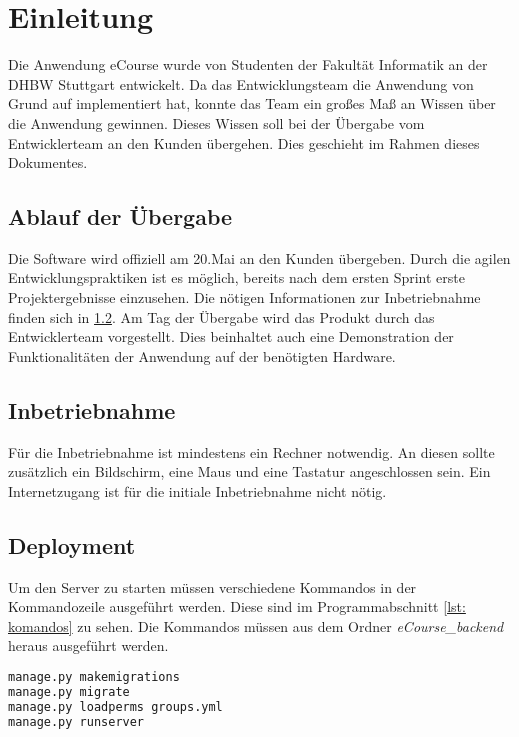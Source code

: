 
\chapter{Einleitung}

Die Anwendung eCourse wurde von Studenten der Fakultät Informatik an der DHBW Stuttgart entwickelt. Da das Entwicklungsteam die Anwendung von Grund auf implementiert hat, konnte das Team ein großes Maß an Wissen über die Anwendung gewinnen. Dieses Wissen soll bei der Übergabe vom Entwicklerteam an den Kunden übergehen. Dies geschieht im Rahmen dieses Dokumentes. 

\section{Ablauf der Übergabe}
Die Software wird offiziell am 20.Mai an den Kunden übergeben. Durch die agilen Entwicklungspraktiken ist es möglich, bereits nach dem ersten Sprint erste Projektergebnisse einzusehen. Die nötigen Informationen zur Inbetriebnahme finden sich in \ref{sec:inbetrieb}.
Am Tag der Übergabe wird das Produkt durch das Entwicklerteam vorgestellt. Dies beinhaltet auch eine Demonstration der Funktionalitäten der Anwendung auf der benötigten Hardware.

\section{Inbetriebnahme}
\label{sec:inbetrieb}
Für die Inbetriebnahme ist mindestens ein Rechner notwendig. An diesen sollte zusätzlich ein Bildschirm, eine Maus und eine Tastatur angeschlossen sein. Ein Internetzugang ist für die initiale Inbetriebnahme nicht nötig.

\section{Deployment}
Um den Server zu starten müssen verschiedene Kommandos in der Kommandozeile ausgeführt werden. Diese sind im Programmabschnitt \ref{lst: komandos} zu sehen. Die Kommandos müssen aus dem Ordner \textit{eCourse\_backend} heraus ausgeführt werden. \\

\begin{lstlisting}[language = bash, caption = Kommandozeilenanweisungen zum Starten des Servers, label = lst: komandos]
manage.py makemigrations
manage.py migrate
manage.py loadperms groups.yml
manage.py runserver
\end{lstlisting}

